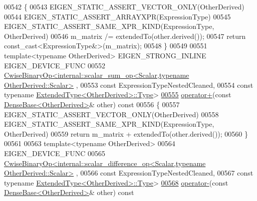 \begin{DoxyCode}
00542     \{
00543       EIGEN\_STATIC\_ASSERT\_VECTOR\_ONLY(OtherDerived)
00544       EIGEN\_STATIC\_ASSERT\_ARRAYXPR(ExpressionType)
00545       EIGEN\_STATIC\_ASSERT\_SAME\_XPR\_KIND(ExpressionType, OtherDerived)
00546       m\_matrix /= extendedTo(other.derived());
00547       \textcolor{keywordflow}{return} \textcolor{keyword}{const\_cast<}ExpressionType&\textcolor{keyword}{>}(m\_matrix);
00548     \}
00549 
00551     \textcolor{keyword}{template}<\textcolor{keyword}{typename} OtherDerived> EIGEN\_STRONG\_INLINE EIGEN\_DEVICE\_FUNC
00552     \hyperlink{group___core___module_class_eigen_1_1_cwise_binary_op}{CwiseBinaryOp<internal::scalar\_sum\_op<Scalar,typename OtherDerived::Scalar>}
      ,
00553                   \textcolor{keyword}{const} ExpressionTypeNestedCleaned,
00554                   \textcolor{keyword}{const} \textcolor{keyword}{typename} \hyperlink{group___core___module_class_eigen_1_1_replicate}{ExtendedType<OtherDerived>::Type}>
\hyperlink{group___core___module_ad38bb674b896bfc8f96baeb487aa2184}{00555}     \hyperlink{group___core___module_ad38bb674b896bfc8f96baeb487aa2184}{operator+}(\textcolor{keyword}{const} \hyperlink{group___core___module_class_eigen_1_1_dense_base}{DenseBase<OtherDerived>}& other)\textcolor{keyword}{ const}
00556 \textcolor{keyword}{    }\{
00557       EIGEN\_STATIC\_ASSERT\_VECTOR\_ONLY(OtherDerived)
00558       EIGEN\_STATIC\_ASSERT\_SAME\_XPR\_KIND(ExpressionType, OtherDerived)
00559       \textcolor{keywordflow}{return} m\_matrix + extendedTo(other.derived());
00560     \}
00561 
00563     \textcolor{keyword}{template}<\textcolor{keyword}{typename} OtherDerived>
00564     EIGEN\_DEVICE\_FUNC
00565     
      \hyperlink{group___core___module_class_eigen_1_1_cwise_binary_op}{CwiseBinaryOp<internal::scalar\_difference\_op<Scalar,typename OtherDerived::Scalar>}
      ,
00566                   \textcolor{keyword}{const} ExpressionTypeNestedCleaned,
00567                   \textcolor{keyword}{const} \textcolor{keyword}{typename} \hyperlink{group___core___module_class_eigen_1_1_replicate}{ExtendedType<OtherDerived>::Type}>
\hyperlink{group___core___module_a5aced68defd8d0fd08829386b6c285fb}{00568}     \hyperlink{group___core___module_a5aced68defd8d0fd08829386b6c285fb}{operator-}(\textcolor{keyword}{const} \hyperlink{group___core___module_class_eigen_1_1_dense_base}{DenseBase<OtherDerived>}& other)\textcolor{keyword}{ const}

\end{DoxyCode}
